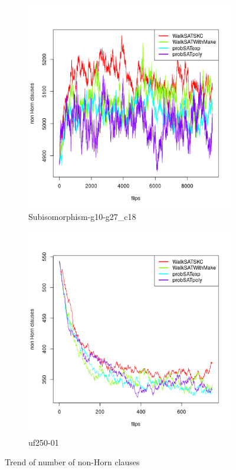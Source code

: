 \documentclass[12pt,a4paper]{article}
\begin{document}
\begin{figure}[H]
  \begin{subfigure}{0.45\textwidth}
    \includegraphics[width=\textwidth]{trends/Subisomorphism-g10-g27_c18[SKIP=0].png}
    \caption{Subisomorphism-g10-g27\_c18}
  \end{subfigure}
  \begin{subfigure}{0.45\textwidth}
    \includegraphics[width=\textwidth]{trends/uf250-01[SKIP=0].png}
    \caption{uf250-01}
  \end{subfigure}
  \caption{Trend of number of non-Horn clauses}
  \label{fig:trend}
\end{figure}
\end{document}
